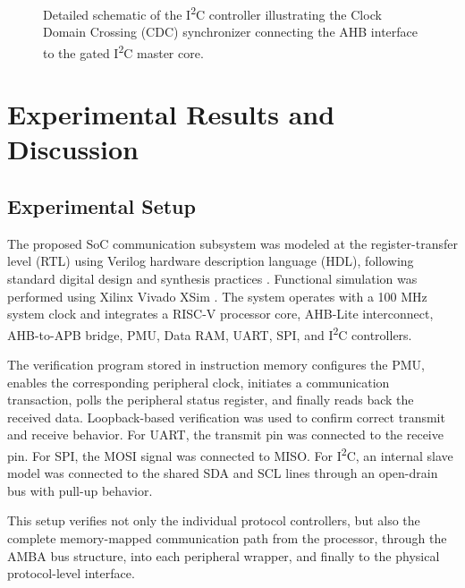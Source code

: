 \documentclass[runningheads]{llncs}
\begin{document}
\begin{figure}
{}
\caption{Detailed schematic of the I\textsuperscript{2}C controller illustrating the Clock Domain Crossing (CDC) synchronizer connecting the AHB interface to the gated I\textsuperscript{2}C master core.}
\label{fig:i2c_schem}
\end{figure}

\section{Experimental Results and Discussion}
\label{sec:results}

\subsection{Experimental Setup}

The proposed SoC communication subsystem was modeled at the register-transfer level (RTL) using Verilog hardware description language (HDL), following standard digital design and synthesis practices \cite{palnitkar2003,chu2008}. Functional simulation was performed using Xilinx Vivado XSim \cite{xilinx2018}. The system operates with a 100 MHz system clock and integrates a RISC-V processor core, AHB-Lite interconnect, AHB-to-APB bridge, PMU, Data RAM, UART, SPI, and I\textsuperscript{2}C controllers.

The verification program stored in instruction memory configures the PMU, enables the corresponding peripheral clock, initiates a communication transaction, polls the peripheral status register, and finally reads back the received data. Loopback-based verification was used to confirm correct transmit and receive behavior. For UART, the transmit pin was connected to the receive pin. For SPI, the MOSI signal was connected to MISO. For I\textsuperscript{2}C, an internal slave model was connected to the shared SDA and SCL lines through an open-drain bus with pull-up behavior.

This setup verifies not only the individual protocol controllers, but also the complete memory-mapped communication path from the processor, through the AMBA bus structure, into each peripheral wrapper, and finally to the physical protocol-level interface.
\end{document}
